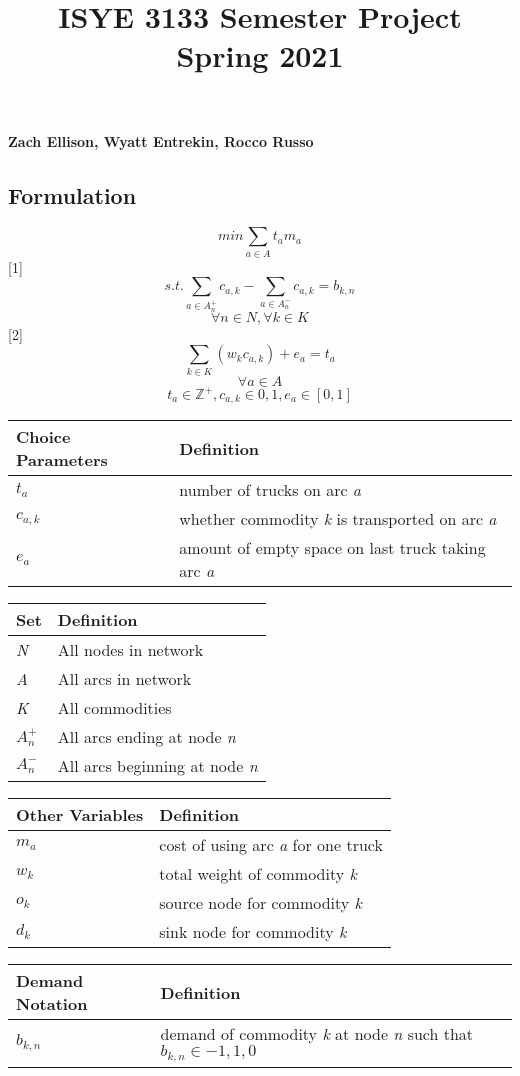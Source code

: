 \documentclass[
]{article}
\title{ISYE 3133 Semester Project Spring 2021}
\author{}
\date{\vspace{-2.5em}}
\begin{document}
\maketitle

\textbf{Zach Ellison, Wyatt Entrekin, Rocco Russo}

\hypertarget{formulation}{%
\subsection{Formulation}\label{formulation}}

\[min \sum_{a\in A}t_am_a\]
{[}1{]}\[s.t. \sum_{a\in A_n^+}c_{a,k} -\sum_{a\in A_n^-}c_{a,k}=b_{k,n}\]
\[\forall n \in N, \forall k \in K\]
{[}2{]}\[\sum_{k\in K}(w_kc_{a,k})+e_a=t_a\] \[\forall a \in A\]
\[t_a \in \mathbb{Z}^+, c_{a,k} \in {0,1}, e_a \in [0,1]\]

\begin{longtable}[]{@{}ll@{}}
\toprule
\textbf{Choice Parameters} & \textbf{Definition}\tabularnewline
\midrule
\endhead
\(t_a\) & number of trucks on arc \emph{a}\tabularnewline
\(c_{a,k}\) & whether commodity \emph{k} is transported on arc
\emph{a}\tabularnewline
\(e_a\) & amount of empty space on last truck taking arc
\emph{a}\tabularnewline
\bottomrule
\end{longtable}

\begin{longtable}[]{@{}ll@{}}
\toprule
\textbf{Set} & \textbf{Definition}\tabularnewline
\midrule
\endhead
\emph{N} & All nodes in network\tabularnewline
\emph{A} & All arcs in network\tabularnewline
\emph{K} & All commodities\tabularnewline
\(A_n^+\) & All arcs ending at node \emph{n}\tabularnewline
\(A_n^-\) & All arcs beginning at node \emph{n}\tabularnewline
\bottomrule
\end{longtable}

\begin{longtable}[]{@{}ll@{}}
\toprule
\textbf{Other Variables} & \textbf{Definition}\tabularnewline
\midrule
\endhead
\(m_a\) & cost of using arc \emph{a} for one truck\tabularnewline
\(w_k\) & total weight of commodity \emph{k}\tabularnewline
\(o_k\) & source node for commodity \emph{k}\tabularnewline
\(d_k\) & sink node for commodity \emph{k}\tabularnewline
\bottomrule
\end{longtable}

\begin{longtable}[]{@{}ll@{}}
\toprule
\textbf{Demand Notation} & \textbf{Definition}\tabularnewline
\midrule
\endhead
\(b_{k,n}\) & demand of commodity \emph{k} at node \emph{n} such that
\(b_{k,n}\in {-1,1,0}\)\tabularnewline
\bottomrule
\end{longtable}
\end{document}
